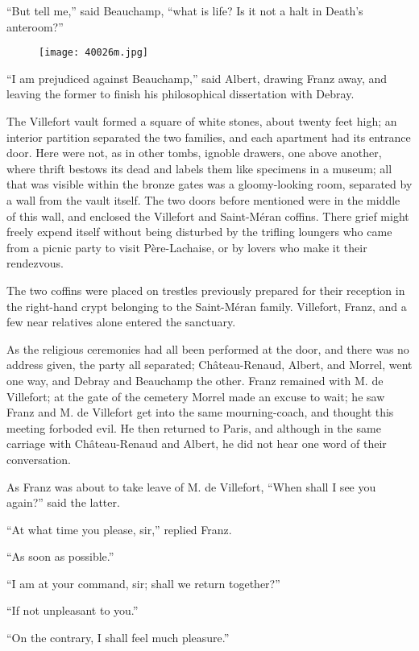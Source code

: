 “But tell me,” said Beauchamp, “what is life? Is it not a halt in
Death’s anteroom?”

\begin{figure}[ht]
\texttt{[image: 40026m.jpg]}
\end{figure}

“I am prejudiced against Beauchamp,” said Albert, drawing Franz away,
and leaving the former to finish his philosophical dissertation with
Debray.

The Villefort vault formed a square of white stones, about twenty feet
high; an interior partition separated the two families, and each
apartment had its entrance door. Here were not, as in other tombs,
ignoble drawers, one above another, where thrift bestows its dead and
labels them like specimens in a museum; all that was visible within the
bronze gates was a gloomy-looking room, separated by a wall from the
vault itself. The two doors before mentioned were in the middle of this
wall, and enclosed the Villefort and Saint-Méran coffins. There grief
might freely expend itself without being disturbed by the trifling
loungers who came from a picnic party to visit Père-Lachaise, or by
lovers who make it their rendezvous.

The two coffins were placed on trestles previously prepared for their
reception in the right-hand crypt belonging to the Saint-Méran family.
Villefort, Franz, and a few near relatives alone entered the sanctuary.

As the religious ceremonies had all been performed at the door, and
there was no address given, the party all separated; Château-Renaud,
Albert, and Morrel, went one way, and Debray and Beauchamp the other.
Franz remained with M. de Villefort; at the gate of the cemetery Morrel
made an excuse to wait; he saw Franz and M. de Villefort get into the
same mourning-coach, and thought this meeting forboded evil. He then
returned to Paris, and although in the same carriage with
Château-Renaud and Albert, he did not hear one word of their
conversation.

As Franz was about to take leave of M. de Villefort, “When shall I see
you again?” said the latter.

“At what time you please, sir,” replied Franz.

“As soon as possible.”

“I am at your command, sir; shall we return together?”

“If not unpleasant to you.”

“On the contrary, I shall feel much pleasure.”

